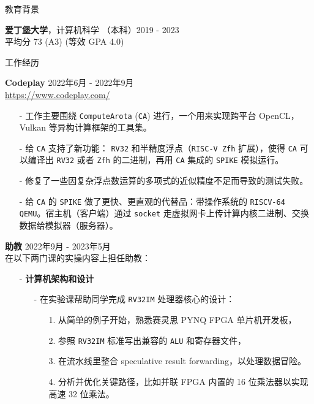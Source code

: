 \documentclass{resume} %
\newcommand{\itemsepval}{-6pt}
\newcommand{\code}{\texttt}
\begin{document}
\begin{rSection}{教育背景}

{\bf  爱丁堡大学}，计算机科学 （本科）\hfill {2019 - 2023} \\
平均分 73 (A3) (等效 GPA 4.0)

\end{rSection}

\begin{rSection}{工作经历}


     
    \textbf{Codeplay} \hfill 2022年6月 - 2022年9月 \\
    \url{https://www.codeplay.com/} \hfill \par
    \begin{itemize}
        \itemsep \itemsepval {} 
        \item[-] 工作主要围绕 \code{ComputeArota} (\code{CA}) 进行，一个用来实现跨平台 OpenCL，Vulkan 等异构计算框架的工具集。
        \item[-] 给 \code{CA} 支持了新功能： \code{RV32} 和半精度浮点（\code{RISC-V Zfh} 扩展），使得 \code{CA} 可以编译出 \code{RV32} 或者 \code{Zfh} 的二进制，再用 \code{CA} 集成的 \code{SPIKE} 模拟运行。
        \item[-] 修复了一些因复杂浮点数运算的多项式的近似精度不足而导致的测试失败。
        \item[-] 给 \code{CA} 的 \code{SPIKE} 做了更快、更直观的代替品：带操作系统的 \code{RISCV-64 QEMU}。宿主机（客户端）通过 \code{socket} 走虚拟网卡上传计算内核二进制、交换数据给模拟器（服务器）。
    \end{itemize}
    
    \textbf{助教} \hfill 2022年9月 - 2023年5月     \\
    在以下两门课的实操内容上担任助教： \hfill 
    \begin{itemize}
        \itemsep \itemsepval {} 
        \item[-] \textbf{计算机架构和设计} 
        \begin{itemize}
            \itemsep \itemsepval {} 
            \item[-] 在实验课帮助同学完成 \code{RV32IM} 处理器核心的设计：
            \begin{itemize}
                \itemsep \itemsepval {} 
                \item[1.] 从简单的例子开始，熟悉赛灵思 PYNQ FPGA 单片机开发板，
                \item[2.] 参照 \code{RV32IM} 标准写出兼容的 \code{ALU} 和寄存器文件， 
                \item[3.] 在流水线里整合 speculative result forwarding，以处理数据冒险。
                \item[4.] 分析并优化关键路径，比如并联 FPGA 内置的 16 位乘法器以实现高速 32 位乘法。
            \end{itemize}
    

\end{itemize}
\end{itemize}
\end{rSection}
\end{document}
